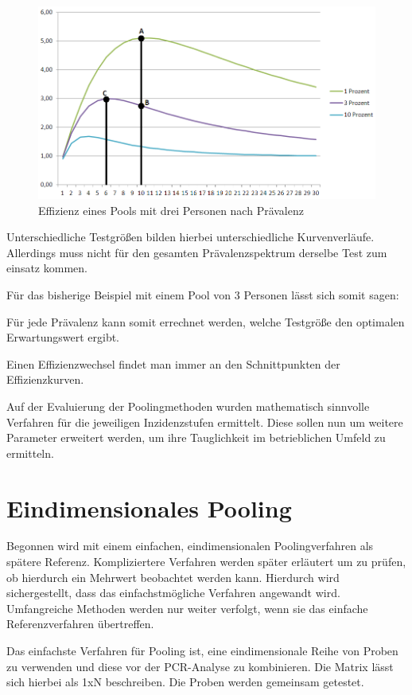 \begin{figure}[h]
	\centering
	\includegraphics[width=1\textwidth]{img/EffizienzTestgruppePfeile}
	\caption{Effizienz eines Pools mit drei Personen nach Prävalenz}
\end{figure}

Unterschiedliche Testgrößen bilden hierbei unterschiedliche Kurvenverläufe.
Allerdings muss nicht für den gesamten Prävalenzspektrum derselbe Test zum einsatz kommen.

Für das bisherige Beispiel mit einem Pool von 3 Personen lässt sich somit sagen:


Für jede Prävalenz kann somit errechnet werden, welche Testgröße den optimalen Erwartungswert ergibt.

Einen Effizienzwechsel findet man immer an den Schnittpunkten der Effizienzkurven.

Auf der Evaluierung der Poolingmethoden wurden mathematisch sinnvolle Verfahren für die jeweiligen Inzidenzstufen ermittelt.
Diese sollen nun um weitere Parameter erweitert werden, um ihre Tauglichkeit im betrieblichen Umfeld zu ermitteln.

\section{Eindimensionales Pooling}
Begonnen wird mit einem einfachen, eindimensionalen Poolingverfahren als spätere Referenz.
Kompliziertere Verfahren werden später erläutert um zu prüfen, ob hierdurch ein Mehrwert beobachtet werden kann.
Hierdurch wird sichergestellt, dass das einfachstmögliche Verfahren angewandt wird.
Umfangreiche Methoden werden nur weiter verfolgt, wenn sie das einfache Referenzverfahren übertreffen.

Das einfachste Verfahren für Pooling ist, eine eindimensionale Reihe von Proben zu verwenden und diese vor der PCR-Analyse zu kombinieren.
Die Matrix lässt sich hierbei als 1xN beschreiben.
Die Proben werden gemeinsam getestet.

